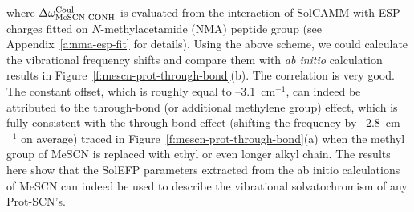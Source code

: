 \documentclass[b5paper,oneside,fleqn,11pt]{book}
\begin{document}
\begin{refsection}
\begin{equation}
\end{equation}
%
where $\Delta\omega_{\text{MeSCN-CONH}}^{\rm Coul}$
is evaluated from the interaction of
SolCAMM with ESP charges fitted on $N$-methylacetamide
(NMA) peptide group (see Appendix~\ref{a:nma-esp-fit} for details). Using the above
scheme, we could calculate the vibrational frequency shifts
and compare them with \emph{ab initio} calculation results in Figure~\ref{f:mescn-prot-through-bond}(b). 
The correlation is very good. The constant offset, which is
roughly equal to --3.1~cm$^{-1}$, can indeed be attributed to the
through\hyp{}bond (or additional methylene group) effect, which is
fully consistent with the through\hyp{}bond effect (shifting the
frequency by --2.8~cm$^{-1}$ on average) traced 
in Figure~\ref{f:mescn-prot-through-bond}(a) when
the methyl group of MeSCN is replaced with ethyl or even
longer alkyl chain. The results here show that the SolEFP
parameters extracted from the ab initio calculations of MeSCN
can indeed be used to describe the vibrational
solvatochromism of any Prot-SCN's.


\end{refsection}
\end{document}
